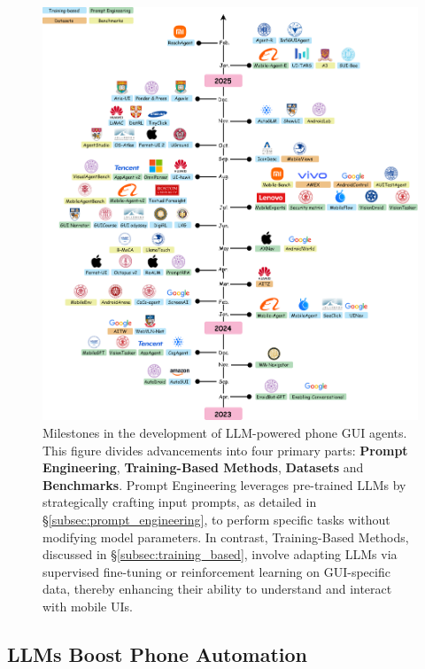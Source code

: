 \begin{figure}[!ht]
\centering
\includegraphics[width=0.95\linewidth]{figures/llm_phone_agent_milestones_optimized.png}
\caption{Milestones in the development of LLM-powered phone GUI agents. This figure divides advancements into four primary parts: \textbf{Prompt Engineering},  \textbf{Training-Based Methods}, \textbf{Datasets} and \textbf{Benchmarks}. Prompt Engineering leverages pre-trained LLMs by strategically crafting input prompts, as detailed in \S\ref{subsec:prompt_engineering}, to perform specific tasks without modifying model parameters. In contrast, Training-Based Methods, discussed in \S\ref{subsec:training_based}, involve adapting LLMs via supervised fine-tuning or reinforcement learning on GUI-specific data, thereby enhancing their ability to understand and interact with mobile UIs.}
\label{fig:llm_phone_agent_milestones}
\end{figure}

\subsection{LLMs Boost Phone Automation}
\label{subsec:llms_boost_automation}

